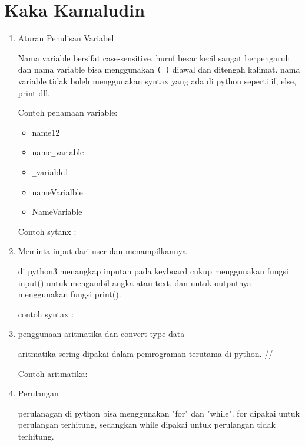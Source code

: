 \section{Kaka Kamaludin}
\begin{enumerate}

\item Aturan Penulisan Variabel
\begin{flushleft}
\qquad Nama variable bersifat case-sensitive, huruf besar kecil sangat berpengaruh dan nama variable bisa menggunakan \verb|(_)| diawal dan ditengah kalimat. nama variable tidak boleh menggunakan syntax yang ada di python seperti if, else, print dll.\\
\end{flushleft}
Contoh penamaan variable:
	\begin{itemize}
	\item name12
	\item name\verb|_|variable
	\item \verb|_|variable1
	\item nameVarialble
	\item NameVariable
	\end{itemize}
	
Contoh sytanx :



\item Meminta input dari user dan menampilkannya
\begin{flushleft}
\qquad di python3 menangkap inputan pada keyboard cukup menggunakan fungsi input() untuk mengambil angka atau text. dan untuk outputnya menggunakan fungsi print().\\
\end{flushleft}
contoh syntax :



\item penggunaan aritmatika dan convert type data
\begin{flushleft}
\qquad aritmatika sering dipakai dalam pemrograman terutama di python. //
\end{flushleft}
Contoh aritmatika:



\item Perulangan 
\begin{flushleft}
\qquad perulanagan di python bisa menggunakan "for" dan "while". for dipakai untuk perulangan terhitung, sedangkan while dipakai untuk perulangan tidak terhitung.\\
\end{flushleft}




\end{enumerate}
